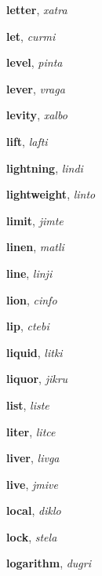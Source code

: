 \documentclass[12pt]{book}
\begin{document}
\begin{description}
\item[ ] \textbf{letter}, \textit{xatra}

\item[ ] \textbf{let}, \textit{curmi}

\item[ ] \textbf{level}, \textit{pinta}

\item[ ] \textbf{lever}, \textit{vraga}

\item[ ] \textbf{levity}, \textit{xalbo}

\item[ ] \textbf{lift}, \textit{lafti}

\item[ ] \textbf{lightning}, \textit{lindi}

\item[ ] \textbf{lightweight}, \textit{linto}

\item[ ] \textbf{limit}, \textit{jimte}

\item[ ] \textbf{linen}, \textit{matli}

\item[ ] \textbf{line}, \textit{linji}

\item[ ] \textbf{lion}, \textit{cinfo}

\item[ ] \textbf{lip}, \textit{ctebi}

\item[ ] \textbf{liquid}, \textit{litki}

\item[ ] \textbf{liquor}, \textit{jikru}

\item[ ] \textbf{list}, \textit{liste}

\item[ ] \textbf{liter}, \textit{litce}

\item[ ] \textbf{liver}, \textit{livga}

\item[ ] \textbf{live}, \textit{jmive}

\item[ ] \textbf{local}, \textit{diklo}

\item[ ] \textbf{lock}, \textit{stela}

\item[ ] \textbf{logarithm}, \textit{dugri}


\end{description}
\end{document}
